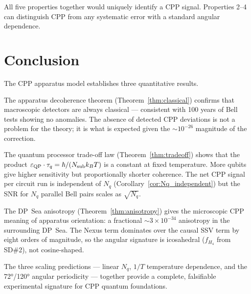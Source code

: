 \documentclass[11pt,a4paper]{article}
\newcommand{\eps}{\varepsilon}
\begin{document}
All five properties together would uniquely identify a CPP signal.
Properties 2--4 can distinguish CPP from any systematic error with
a standard angular dependence.

\section{Conclusion}

The CPP apparatus model establishes three quantitative results.

The apparatus decoherence theorem (Theorem~\ref{thm:classical})
confirms that macroscopic detectors are always classical ---
consistent with 100 years of Bell tests showing no anomalies.  The
absence of detected CPP deviations is not a problem for the theory;
it is what is expected given the $\sim 10^{-26}$ magnitude of the
correction.

The quantum processor trade-off law (Theorem~\ref{thm:tradeoff})
shows that the product $\eps_{\rm QP} \cdot \tau_q = \hbar /
(N_{\rm sub} k_B T)$ is a constant at fixed temperature.  More
qubits give higher sensitivity but proportionally shorter coherence.
The net CPP signal per circuit run is independent of $N_q$
(Corollary~\ref{cor:Nq_independent}) but the SNR for $N_q$ parallel
Bell pairs scales as $\sqrt{N_q}$.

The DP~Sea anisotropy (Theorem~\ref{thm:anisotropy}) gives the
microscopic CPP meaning of apparatus orientation: a fractional
$\sim 3 \times 10^{-34}$ anisotropy in the surrounding DP~Sea.
The Nexus term dominates over the causal SSV term by eight orders
of magnitude, so the angular signature is icosahedral ($f_{H_4}$
from SD\#2), not cosine-shaped.

The three scaling predictions --- linear $N_q$, $1/T$ temperature
dependence, and the 72°/120° angular periodicity --- together provide
a complete, falsifiable experimental signature for CPP quantum
foundations.
\end{document}

